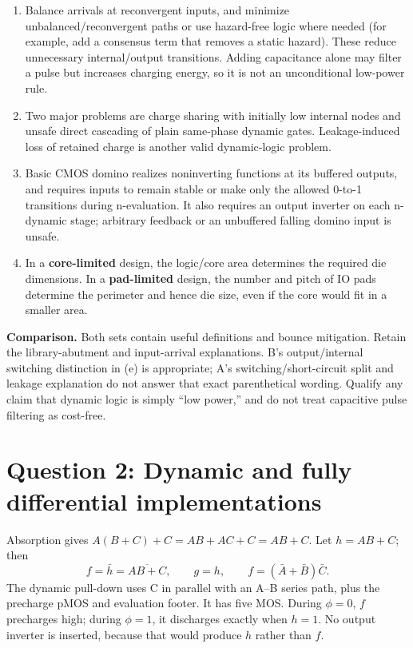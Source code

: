 \documentclass[10pt]{article}
\begin{document}
\begin{enumerate}[label=(\alph*)]
\item Balance arrivals at reconvergent inputs, and minimize unbalanced/reconvergent paths or use hazard-free logic where needed (for example, add a consensus term that removes a static hazard). These reduce unnecessary internal/output transitions. Adding capacitance alone may filter a pulse but increases charging energy, so it is not an unconditional low-power rule.
\item Two major problems are charge sharing with initially low internal nodes and unsafe direct cascading of plain same-phase dynamic gates. Leakage-induced loss of retained charge is another valid dynamic-logic problem.
\item Basic CMOS domino realizes noninverting functions at its buffered outputs, and requires inputs to remain stable or make only the allowed 0-to-1 transitions during n-evaluation. It also requires an output inverter on each n-dynamic stage; arbitrary feedback or an unbuffered falling domino input is unsafe.
\item In a \textbf{core-limited} design, the logic/core area determines the required die dimensions. In a \textbf{pad-limited} design, the number and pitch of IO pads determine the perimeter and hence die size, even if the core would fit in a smaller area.
\end{enumerate}
\textbf{Comparison.} Both sets contain useful definitions and bounce mitigation. Retain the library-abutment and input-arrival explanations. B's output/internal switching distinction in (e) is appropriate; A's switching/short-circuit split and leakage explanation do not answer that exact parenthetical wording. Qualify any claim that dynamic logic is simply ``low power,'' and do not treat capacitive pulse filtering as cost-free.

\newpage\section*{Question 2: Dynamic and fully differential implementations}
Absorption gives $A(B+C)+C=AB+AC+C=AB+C$. Let $h=AB+C$; then
\[\boxed{f=\bar h=\overline{AB+C},\qquad g=h,\qquad f=(\bar A+\bar B)\bar C.}\]
The dynamic pull-down uses C in parallel with an A--B series path, plus the precharge pMOS and evaluation footer. It has five MOS. During $\phi=0$, $f$ precharges high; during $\phi=1$, it discharges exactly when $h=1$. No output inverter is inserted, because that would produce $h$ rather than $f$.
\end{document}

